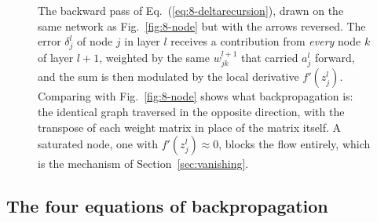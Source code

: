 \begin{figure}[htbp]
\centering
{}
\caption{The backward pass of Eq.~(\ref{eq:8-deltarecursion}), drawn on the
same network as Fig.~\ref{fig:8-node} but with the arrows reversed.  The error
$\delta_j^{l}$ of node $j$ in layer $l$ receives a contribution from
\emph{every} node $k$ of layer $l+1$, weighted by the same $w_{jk}^{l+1}$ that
carried $a_j^{l}$ forward, and the sum is then modulated by the local
derivative $f'(z_j^{l})$.  Comparing with Fig.~\ref{fig:8-node} shows what
backpropagation is: the identical graph traversed in the opposite direction,
with the transpose of each weight matrix in place of the matrix itself.  A
saturated node, one with $f'(z_j^{l})\approx0$, blocks the flow entirely, which
is the mechanism of Section~\ref{sec:vanishing}.}
\label{fig:8-backprop}
\end{figure}

\subsection{The four equations of backpropagation}
\label{sec:backpropeqs}

